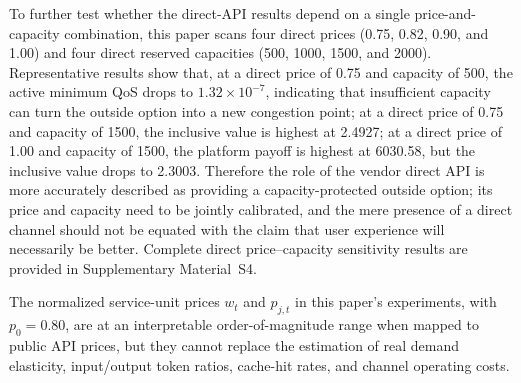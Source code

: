 \documentclass[11pt,a4paper]{article}
\begin{document}
\begin{table}[H]
\centering
\caption{Experimental results with the direct API as a user-choice option}
\label{tab:direct_api_choice}
\small
{}
\end{table}

To further test whether the direct-API results depend on a single price-and-capacity combination, this paper scans four direct prices (0.75, 0.82, 0.90, and 1.00) and four direct reserved capacities (500, 1000, 1500, and 2000). Representative results show that, at a direct price of 0.75 and capacity of 500, the active minimum QoS drops to $1.32\times10^{-7}$, indicating that insufficient capacity can turn the outside option into a new congestion point; at a direct price of 0.75 and capacity of 1500, the inclusive value is highest at 2.4927; at a direct price of 1.00 and capacity of 1500, the platform payoff is highest at 6030.58, but the inclusive value drops to 2.3003. Therefore the role of the vendor direct API is more accurately described as providing a capacity-protected outside option; its price and capacity need to be jointly calibrated, and the mere presence of a direct channel should not be equated with the claim that user experience will necessarily be better. Complete direct price--capacity sensitivity results are provided in Supplementary Material~S4.

The normalized service-unit prices $w_t$ and $p_{j,t}$ in this paper's experiments, with $p_0=0.80$, are at an interpretable order-of-magnitude range when mapped to public API prices, but they cannot replace the estimation of real demand elasticity, input/output token ratios, cache-hit rates, and channel operating costs.
\end{document}
